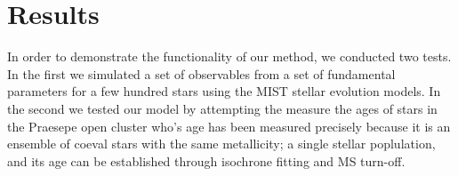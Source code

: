 \section{Results}
\label{section:results}




In order to demonstrate the functionality of our method, we conducted two
tests.
In the first we simulated a set of observables from a set of fundamental
parameters for a few hundred stars using the MIST \citep{choi} stellar
evolution models.
In the second we tested our model by attempting the measure the ages of stars
in the Praesepe open cluster who's age has been measured precisely because it
is an ensemble of coeval stars with the same metallicity; a single stellar
poplulation, and its age can be established through isochrone fitting and MS
turn-off.

